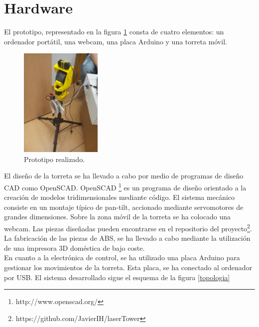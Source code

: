 \newpage

\newpage

\section{Hardware}

El prototipo, representado en la figura \ref{prototipo} consta de cuatro elementos: un ordenador portátil, una webcam, una placa Arduino y una torreta móvil.\\

\begin{figure}[h]
\centering
\includegraphics[width=0.35\textwidth]{images/prototipo}%
\caption{Prototipo realizado.}
\label{prototipo}
\end{figure}
\FloatBarrier

El diseño de la torreta se ha llevado a cabo por medio de programas de diseño CAD como OpenSCAD. OpenSCAD 
\footnote{http://www.openscad.org/} es un programa de diseño orientado a la creación de modelos tridimensionales mediante código. El sistema mecánico consiste en un montaje típico de pan-tilt, accionado mediante servomotores de grandes dimensiones. Sobre la zona móvil de la torreta se ha colocado una webcam. Las piezas diseñadas pueden encontrarse en el repositorio del proyecto\footnote{https://github.com/JavierIH/laserTower}.\\

La fabricación de las piezas de ABS, se ha llevado a cabo mediante la utilización de una impresora 3D doméstica de bajo coste.\\

En cuanto a la electrónica de control, se ha utilizado una placa Arduino para gestionar los movimientos de la torreta. Esta placa, se ha conectado al ordenador por USB. El sistema desarrollado sigue el esquema de la figura \ref{topologia}\\

